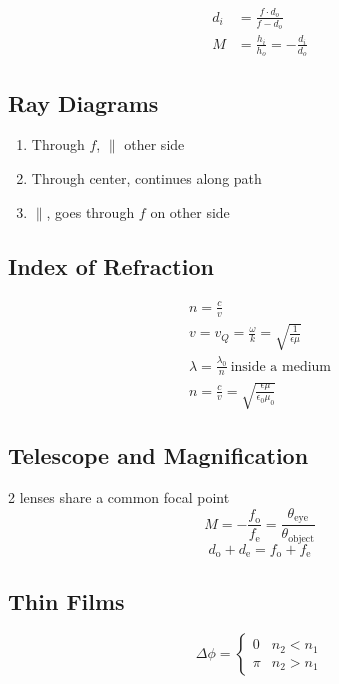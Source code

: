 \documentclass[10pt,a4paper]{article}
\begin{document}
\begin{align}
    d_i &= \frac{f\cdot d_o}{f-d_o}\\
    M &= \frac{h_i}{h_o} = -\frac{d_i}{d_o}
\end{align}

\subsection{Ray Diagrams}
\begin{enumerate}
    \item Through $f$, $\parallel$ other side
    \item Through center, continues along path
    \item $\parallel$, goes through $f$ on other side
\end{enumerate}

\subsection{Index of Refraction}
\begin{align}
    n=\frac{c}{v}  \\
    v = v_Q = \frac{\omega}{k} = \sqrt{\frac{1}{\epsilon \mu}}\\
    \lambda = \frac{\lambda_0}{n}~ \textrm{inside a medium}\\
    n = \frac{c}{v} = \sqrt{\frac{\epsilon \mu}{\epsilon_0 \mu_0}}
\end{align}

\subsection{Telescope and Magnification}
2 lenses share a common focal point
\begin{equation}
 M =  -\frac{f_\textrm{o}}{f_\textrm{e}} = \frac{\theta_\textrm{eye}}{\theta_\textrm{object}}
\end{equation}
\begin{equation}
 d_\textrm{o} + d_\textrm{e} = f_\textrm{o} + f_\textrm{e}
\end{equation}

\subsection{Thin Films}
\[
 \Delta \phi =
  \begin{cases}
   0 &n_2 < n_1\\
   \pi & n_2 > n_1
  \end{cases}
\]
\end{document}
